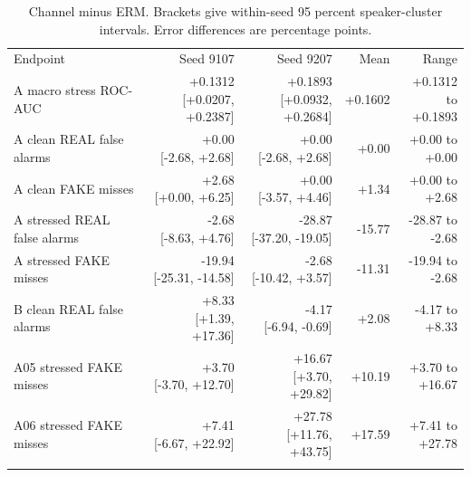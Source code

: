 \begin{table}[t]
\caption{Channel minus ERM. Brackets give within-seed 95 percent speaker-cluster intervals. Error differences are percentage points.}\label{tab:uncertainty}
\centering
\small
\begin{tabular}{@{}lrrrr@{}}
\toprule
Endpoint & Seed 9107 & Seed 9207 & Mean & Range \\
\colrule
A macro stress ROC-AUC & \shortstack[r]{+0.1312\\{[+0.0207, +0.2387]}} & \shortstack[r]{+0.1893\\{[+0.0932, +0.2684]}} & +0.1602 & \shortstack[r]{+0.1312 to\\+0.1893} \\
A clean REAL false alarms & \shortstack[r]{+0.00\\{[-2.68, +2.68]}} & \shortstack[r]{+0.00\\{[-2.68, +2.68]}} & +0.00 & \shortstack[r]{+0.00 to\\+0.00} \\
A clean FAKE misses & \shortstack[r]{+2.68\\{[+0.00, +6.25]}} & \shortstack[r]{+0.00\\{[-3.57, +4.46]}} & +1.34 & \shortstack[r]{+0.00 to\\+2.68} \\
A stressed REAL false alarms & \shortstack[r]{-2.68\\{[-8.63, +4.76]}} & \shortstack[r]{-28.87\\{[-37.20, -19.05]}} & -15.77 & \shortstack[r]{-28.87 to\\-2.68} \\
A stressed FAKE misses & \shortstack[r]{-19.94\\{[-25.31, -14.58]}} & \shortstack[r]{-2.68\\{[-10.42, +3.57]}} & -11.31 & \shortstack[r]{-19.94 to\\-2.68} \\
B clean REAL false alarms & \shortstack[r]{+8.33\\{[+1.39, +17.36]}} & \shortstack[r]{-4.17\\{[-6.94, -0.69]}} & +2.08 & \shortstack[r]{-4.17 to\\+8.33} \\
A05 stressed FAKE misses & \shortstack[r]{+3.70\\{[-3.70, +12.70]}} & \shortstack[r]{+16.67\\{[+3.70, +29.82]}} & +10.19 & \shortstack[r]{+3.70 to\\+16.67} \\
A06 stressed FAKE misses & \shortstack[r]{+7.41\\{[-6.67, +22.92]}} & \shortstack[r]{+27.78\\{[+11.76, +43.75]}} & +17.59 & \shortstack[r]{+7.41 to\\+27.78} \\
\botrule
\end{tabular}
\end{table}
